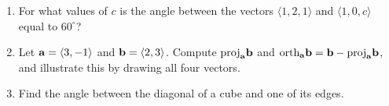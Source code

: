 \documentclass[12pt]{article}
\newcommand{\bfa}{{\bf a}}    %
\newcommand{\bfb}{{\bf b}}    %
\begin{document}
\begin{enumerate}
\item For what values of $c$ is the angle between the vectors $\langle 1,2,1\rangle$ and $\langle 1,0,c\rangle$ equal to $60^\circ$?

\item Let $\bfa=\langle 3,-1\rangle$ and $\bfb=\langle 2,3\rangle$.
      Compute $\mbox{proj}_\bfa \bfb$ and $\mbox{orth}_\bfa \bfb=\bfb-\mbox{proj}_\bfa \bfb$, and illustrate this by drawing all four
      vectors. 

\item Find the angle between the diagonal of a cube and one of its edges.

\end{enumerate}  
\end{document}
